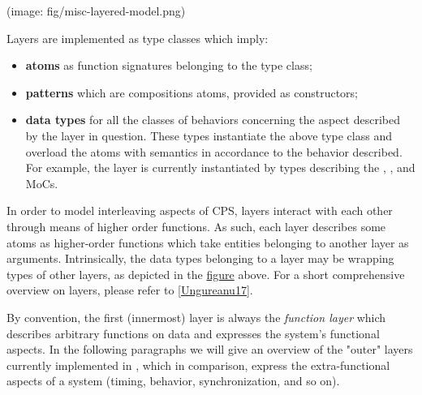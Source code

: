  (image: fig/misc-layered-model.png)\par
                 Layers are implemented as type classes which imply:\par
                 \begin{itemize}
                 \item
                 \textbf{atoms} as function signatures belonging to the type class;\par
                 
                 \item
                 \textbf{patterns} which are compositions atoms, provided as constructors;\par
                 
                 \item
                 \textbf{data types} for all the classes of behaviors concerning the
 aspect described by the layer in question. These types
 instantiate the above type class and overload the atoms with
 semantics in accordance to the behavior described. For example,
 the  layer is currently instantiated by
 types describing the ,
 ,  and
  MoCs.\par
                 
                 \end{itemize}
                 In order to model interleaving aspects of CPS, layers interact
 with each other through means of higher order functions. As such,
 each layer describes some atoms as higher-order functions which
 take entities belonging to another layer as arguments.
 Intrinsically, the data types belonging to a layer may be wrapping
 types of other layers, as depicted in the \href{#layered-model}{figure}
 above. For a short comprehensive overview on layers, please refer
 to \href{ForSyDe-Atom.html#ungureanu17}{[Ungureanu17]}.\par
                 By convention, the first (innermost) layer is always the
 \emph{function layer} which describes arbitrary functions on data and
 expresses the system's functional aspects. In the following
 paragraphs we will give an overview of the "outer" layers
 currently implemented in , which in comparison,
 express the extra-functional aspects of a system (timing,
 behavior, synchronization, and so on).\par
                 
